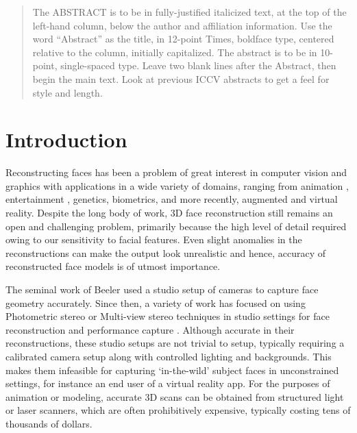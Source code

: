 \documentclass[10pt,twocolumn,letterpaper]{article}
\begin{document}
\begin{abstract}
   The ABSTRACT is to be in fully-justified italicized text, at the top
   of the left-hand column, below the author and affiliation
   information. Use the word ``Abstract'' as the title, in 12-point
   Times, boldface type, centered relative to the column, initially
   capitalized. The abstract is to be in 10-point, single-spaced type.
   Leave two blank lines after the Abstract, then begin the main text.
   Look at previous ICCV abstracts to get a feel for style and length.
\end{abstract}

\section{Introduction}


Reconstructing faces has been a problem of great interest in computer vision and graphics with applications in a wide variety of domains, ranging from animation \cite{ichim2015dynamic}, entertainment \cite{saito2016real}, genetics, biometrics, and more recently, augmented and virtual reality. Despite the long body of work, 3D face reconstruction still remains an open and challenging problem, primarily because the high level of detail required owing to our sensitivity to facial features. Even slight anomalies in the reconstructions can make the output look unrealistic and hence, accuracy of reconstructed face models is of utmost importance.


The seminal work of Beeler \etal \cite{beeler2010high} used a studio setup of cameras to capture face geometry accurately. Since then, a variety of work has focused on using Photometric stereo or Multi-view stereo techniques in studio settings for face reconstruction and performance capture \cite{cao2018sparse, fyffe2017multi}. 
Although accurate in their reconstructions, these studio setups are not trivial to setup, typically requiring a calibrated camera setup along with controlled lighting and backgrounds. This makes them infeasible for capturing `in-the-wild' subject faces in unconstrained settings, for instance an end user of a virtual reality app. For the purposes of animation or modeling, accurate 3D scans can be obtained from structured light or laser scanners, which are often prohibitively expensive, typically costing tens of thousands of dollars. 
\end{document}
